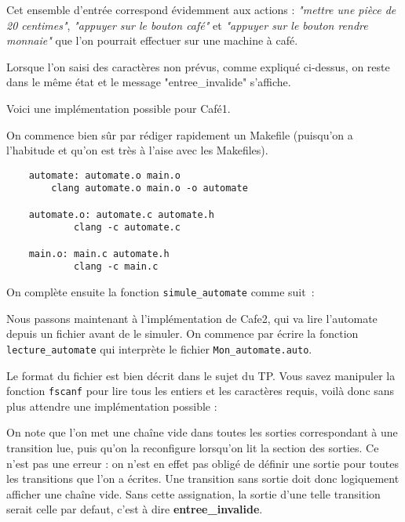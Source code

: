 \documentclass[10pt]{article}
\begin{document}
\begin{enumerate}[label=\textbf{[\alph*]}]
  Cet ensemble d'entrée correspond évidemment aux actions :
  \textit{"mettre une pièce de 20 centimes"}, \textit{"appuyer sur le
    bouton café"} et \textit{"appuyer sur le bouton rendre monnaie"} que l'on
  pourrait effectuer sur une machine à café.

\item Lorsque l'on saisi des caractères non prévus, comme expliqué
  ci-dessus, on reste dans le même état et le message
  "entree\_invalide" s'affiche.

\item Voici une implémentation possible pour Café1.
  \vspace{0.2cm}

  On commence bien sûr par rédiger rapidement un Makefile (puisqu'on a
  l'habitude et qu'on est très à l'aise avec les Makefiles).

  \lstset{style=none}
  \begin{lstlisting}
    automate: automate.o main.o
        clang automate.o main.o -o automate

    automate.o: automate.c automate.h
            clang -c automate.c

    main.o: main.c automate.h
            clang -c main.c
  \end{lstlisting}
  \vspace{0.2cm}

  \newpage
  On complète ensuite la fonction \texttt{simule\_automate} comme
  suit~:

  \lstset{style=customc}
  
  \vspace{0.2cm}

\item Nous passons maintenant à l'implémentation de Cafe2, qui va lire
  l'automate depuis un fichier avant de le simuler. On commence par
  écrire la fonction \texttt{lecture\_automate} qui interprète le
  fichier \texttt{Mon\_automate.auto}.
  \vspace{0.2cm}

  Le format du fichier est bien décrit dans le sujet du TP. Vous savez
  manipuler la fonction \texttt{fscanf} pour lire tous les entiers et
  les caractères requis, voilà donc sans plus attendre une
  implémentation possible :

  \lstset{style=customc}
  
  \vspace{0.2cm}

  On note que l'on met une chaîne vide dans toutes les sorties
  correspondant à une transition lue, puis qu'on la reconfigure
  lorsqu'on lit la section des sorties. Ce n'est pas une erreur : on
  n'est en effet pas obligé de définir une sortie pour toutes les
  transitions que l'on a écrites. Une transition sans sortie doit donc
  logiquement afficher une chaîne vide. Sans cette assignation, la
  sortie d'une telle transition serait celle par defaut, c'est à dire
  \textbf{entree\_invalide}.


\end{enumerate}
\end{document}
